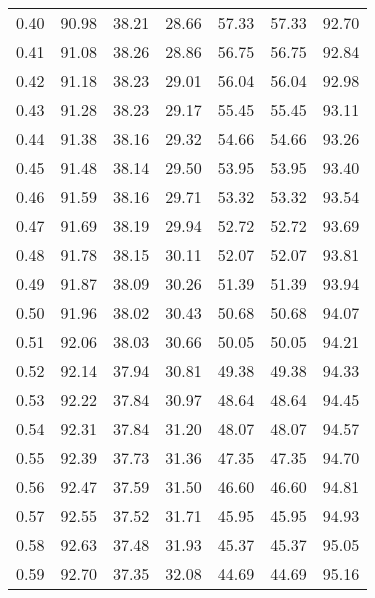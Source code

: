 \begin{tabular}{|c|c|c|c|c|c|c|}
      0.40 &     90.98 &     38.21 &      28.66 &   57.33 &      57.33 &         92.70 \\
      0.41 &     91.08 &     38.26 &      28.86 &   56.75 &      56.75 &         92.84 \\
      0.42 &     91.18 &     38.23 &      29.01 &   56.04 &      56.04 &         92.98 \\
      0.43 &     91.28 &     38.23 &      29.17 &   55.45 &      55.45 &         93.11 \\
      0.44 &     91.38 &     38.16 &      29.32 &   54.66 &      54.66 &         93.26 \\
      0.45 &     91.48 &     38.14 &      29.50 &   53.95 &      53.95 &         93.40 \\
      0.46 &     91.59 &     38.16 &      29.71 &   53.32 &      53.32 &         93.54 \\
      0.47 &     91.69 &     38.19 &      29.94 &   52.72 &      52.72 &         93.69 \\
      0.48 &     91.78 &     38.15 &      30.11 &   52.07 &      52.07 &         93.81 \\
      0.49 &     91.87 &     38.09 &      30.26 &   51.39 &      51.39 &         93.94 \\
      0.50 &     91.96 &     38.02 &      30.43 &   50.68 &      50.68 &         94.07 \\
      0.51 &     92.06 &     38.03 &      30.66 &   50.05 &      50.05 &         94.21 \\
      0.52 &     92.14 &     37.94 &      30.81 &   49.38 &      49.38 &         94.33 \\
      0.53 &     92.22 &     37.84 &      30.97 &   48.64 &      48.64 &         94.45 \\
      0.54 &     92.31 &     37.84 &      31.20 &   48.07 &      48.07 &         94.57 \\
      0.55 &     92.39 &     37.73 &      31.36 &   47.35 &      47.35 &         94.70 \\
      0.56 &     92.47 &     37.59 &      31.50 &   46.60 &      46.60 &         94.81 \\
      0.57 &     92.55 &     37.52 &      31.71 &   45.95 &      45.95 &         94.93 \\
      0.58 &     92.63 &     37.48 &      31.93 &   45.37 &      45.37 &         95.05 \\
      0.59 &     92.70 &     37.35 &      32.08 &   44.69 &      44.69 &         95.16 \\

\end{tabular}
